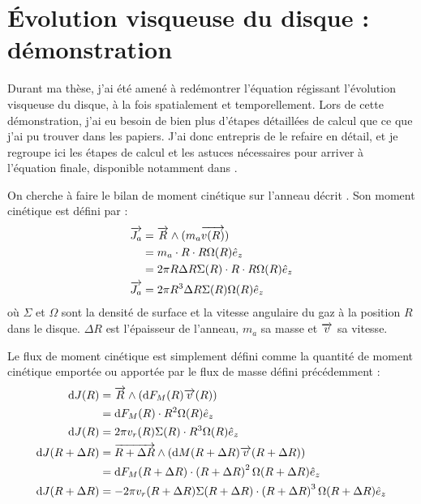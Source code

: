 \chapter{Évolution visqueuse du disque : démonstration}\label{app:equation_angular_momentum}
Durant ma thèse, j'ai été amené à redémontrer l'équation régissant l'évolution visqueuse du disque, à la fois spatialement et temporellement. Lors de cette démonstration, j'ai eu besoin de bien plus d'étapes détaillées de calcul que ce que j'ai pu trouver dans les papiers. J'ai donc entrepris de le refaire en détail, et je regroupe ici les étapes de calcul et les astuces nécessaires pour arriver à l'équation finale, disponible notamment dans \cite{pringle1981accretion}.

\bigskip

On cherche à faire le bilan de moment cinétique sur l'anneau décrit . Son moment cinétique est défini par :
\begin{align}
\vect{J_a} &= \vect{R} \wedge (m_a\vect{v(R)}) \nonumber\\
&= m_a \cdot R \cdot R\Omega(R)\hat{e}_z\nonumber\\
&= 2\pi R \Delta R \Sigma(R)\cdot R \cdot R\Omega(R)\hat{e}_z\nonumber\\
\vect{J_a} &= 2\pi R^3 \Delta R \Sigma(R)\Omega(R)\hat{e}_z\label{eq:J_a2}
\end{align}
où $\Sigma$ et $\Omega$ sont la densité de surface et la vitesse angulaire du gaz à la position $R$ dans le disque. $\Delta R$ est l'épaisseur de l'anneau, $m_a$ sa masse et ${\overrightarrow{v}}$ sa vitesse.

Le flux de moment cinétique est simplement défini comme la quantité de moment cinétique emportée ou apportée par le flux de masse défini précédemment  :
\begin{subequations}
\begin{align}
\dif J(R) &= \vect{R} \wedge \left(\dif F_M(R) \vect{v}(R)\right)\nonumber\\
 &= \dif F_M(R) \cdot R^2\Omega(R)\hat{e}_z\nonumber\\
\dif J(R) &= 2\pi v_r(R) \Sigma(R)\cdot R^3\Omega(R)\hat{e}_z\label{eq:dJ_in2}\\
\dif J(R+\Delta R) &= \vect{R+\Delta R} \wedge \left(\dif M(R+\Delta R) \vect{v}(R+\Delta R)\right)\nonumber\\
 &= \dif F_M(R+\Delta R) \cdot \left(R+\Delta R\right)^2\Omega(R+\Delta R)\hat{e}_z\nonumber\\
\dif J(R+\Delta R) &= -2\pi v_r(R+\Delta R) \Sigma(R+\Delta R)\cdot \left(R+\Delta R\right)^3\Omega(R+\Delta R)\hat{e}_z\label{eq:dJ_out2}
\end{align}\label{eq:dJ2}
\end{subequations}

